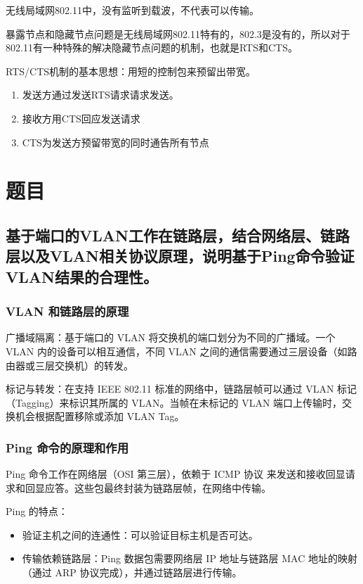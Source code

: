 \documentclass[11pt]{article}
\begin{document}
无线局域网802.11中，没有监听到载波，不代表可以传输。

暴露节点和隐藏节点问题是无线局域网802.11特有的，802.3是没有的，所以对于802.11有一种特殊的解决隐藏节点问题的机制，也就是RTS和CTS。

RTS/CTS机制的基本思想：用短的控制包来预留出带宽。

\begin{enumerate}
\item 发送方通过发送RTS请求请求发送。
\item 接收方用CTS回应发送请求
\item CTS为发送方预留带宽的同时通告所有节点
\end{enumerate}
\section{题目}
\label{sec:org5fb3bb7}
\subsection{基于端口的VLAN工作在链路层，结合网络层、链路层以及VLAN相关协议原理，说明基于Ping命令验证VLAN结果的合理性。}
\label{sec:org5bf2060}

\subsubsection{VLAN 和链路层的原理}
\label{sec:org228a43f}

广播域隔离：基于端口的 VLAN 将交换机的端口划分为不同的广播域。一个 VLAN 内的设备可以相互通信，不同 VLAN 之间的通信需要通过三层设备（如路由器或三层交换机）的转发。

标记与转发：在支持 IEEE 802.11 标准的网络中，链路层帧可以通过 VLAN 标记（Tagging）来标识其所属的 VLAN。当帧在未标记的 VLAN 端口上传输时，交换机会根据配置移除或添加 VLAN Tag。
\subsubsection{Ping 命令的原理和作用}
\label{sec:org311211f}
Ping 命令工作在网络层（OSI 第三层），依赖于 ICMP 协议 来发送和接收回显请求和回显应答。这些包最终封装为链路层帧，在网络中传输。

Ping 的特点：

\begin{itemize}
\item 验证主机之间的连通性：可以验证目标主机是否可达。
\item 传输依赖链路层：Ping 数据包需要网络层 IP 地址与链路层 MAC 地址的映射（通过 ARP 协议完成），并通过链路层进行传输。
\end{itemize}
\end{document}
